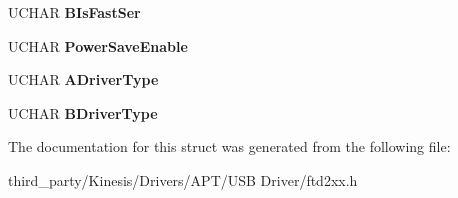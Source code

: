 \begin{DoxyCompactItemize}
\item 
U\+C\+H\+AR {\bfseries B\+Is\+Fast\+Ser}\hypertarget{structft__eeprom__2232h_a1e713eb322844d1d45e0439087571133}{}\label{structft__eeprom__2232h_a1e713eb322844d1d45e0439087571133}

\item 
U\+C\+H\+AR {\bfseries Power\+Save\+Enable}\hypertarget{structft__eeprom__2232h_a411dc2831f568c59e7e7eed513254f94}{}\label{structft__eeprom__2232h_a411dc2831f568c59e7e7eed513254f94}

\item 
U\+C\+H\+AR {\bfseries A\+Driver\+Type}\hypertarget{structft__eeprom__2232h_af3f3a2c5c9aaa729219e0139cdfb9510}{}\label{structft__eeprom__2232h_af3f3a2c5c9aaa729219e0139cdfb9510}

\item 
U\+C\+H\+AR {\bfseries B\+Driver\+Type}\hypertarget{structft__eeprom__2232h_a9a4775d141f2b01fc4d846cb3cd23368}{}\label{structft__eeprom__2232h_a9a4775d141f2b01fc4d846cb3cd23368}

\end{DoxyCompactItemize}


The documentation for this struct was generated from the following file\+:\begin{DoxyCompactItemize}
\item 
third\+\_\+party/\+Kinesis/\+Drivers/\+A\+P\+T/\+U\+S\+B Driver/ftd2xx.\+h\end{DoxyCompactItemize}
